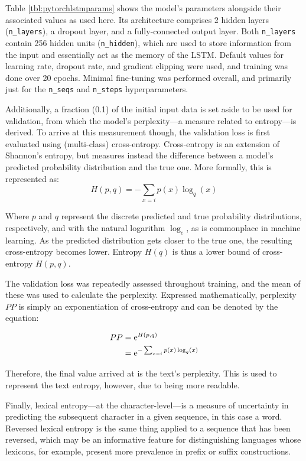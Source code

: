 \documentclass[12pt,a4paper]{article}
\numberwithin{figure}{section}
\numberwithin{table}{section}
\numberwithin{definition}{section}
\begin{document}
Table \ref{tbl:pytorchlstmparams} shows the model's parameters alongside their associated values as used here. Its architecture comprises 2 hidden layers (\texttt{n\_layers}), a dropout layer, and a fully-connected output layer. Both \texttt{n\_layers} contain 256 hidden units (\texttt{n\_hidden}), which are used to store information from the input and essentially act as the memory of the LSTM. Default values for learning rate, dropout rate, and gradient clipping were used, and training was done over 20 epochs. Minimal fine-tuning was performed overall, and primarily just for the \texttt{n\_seqs} and \texttt{n\_steps} hyperparameters. 

Additionally, a fraction (0.1) of the initial input data is set aside to be used for validation, from which the model's perplexity---a measure related to entropy---is derived. To arrive at this measurement though, the validation loss is first evaluated using (multi-class) cross-entropy. Cross-entropy is an extension of Shannon's entropy, but measures instead the difference between a model's predicted probability distribution and the true one. More formally, this is represented as: \[H(p,q) = -\sum_{x=i}p(x)\log_q(x)\]

Where \( p \) and \( q \) represent the discrete predicted and true probability distributions, respectively, and with the natural logarithm \( \log_e \), as is commonplace in machine learning. As the predicted distribution gets closer to the true one, the resulting cross-entropy becomes lower. Entropy \( H(q) \) is thus a lower bound of cross-entropy \( H(p,q) \). 

The validation loss was repeatedly assessed throughout training, and the mean of these was used to calculate the perplexity. Expressed mathematically, perplexity \( PP \) is simply an exponentiation of cross-entropy and can be denoted by the equation: 

\begin{equation}
  \begin{aligned}
    PP &= {\rm e}^{H(p,q)} \\
    &= {\rm e}^{-\sum_{x=i}p(x)\log_q(x)} \\
  \end{aligned}
\end{equation}

Therefore, the final value arrived at is the text's perplexity. This is used to represent the text entropy, however, due to being more readable.

Finally, lexical entropy---at the character-level---is a measure of uncertainty in predicting the subsequent character in a given sequence, in this case a word. Reversed lexical entropy is the same thing applied to a sequence that has been reversed, which may be an informative feature for distinguishing languages whose lexicons, for example, present more prevalence in prefix or suffix constructions. 
\end{document}
